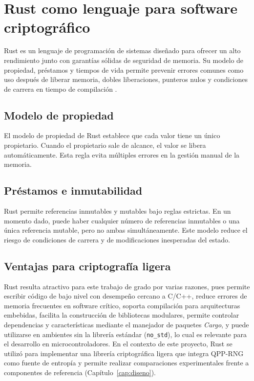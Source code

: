 \section{Rust como lenguaje para software criptográfico}

Rust es un lenguaje de programación de sistemas diseñado para ofrecer un alto rendimiento junto con garantías sólidas de seguridad de memoria. Su modelo de propiedad, préstamos y tiempos de vida permite prevenir errores comunes como uso después de liberar memoria, dobles liberaciones, punteros nulos y condiciones de carrera en tiempo de compilación \cite{Klabnik2023TheLanguage,TheRustProjectDevelopers2024TheLanguage}.

\subsection{Modelo de propiedad}

El modelo de propiedad de Rust establece que cada valor tiene un único propietario. Cuando el propietario sale de alcance, el valor se libera automáticamente. Esta regla evita múltiples errores en la gestión manual de la memoria.

\subsection{Préstamos e inmutabilidad}

Rust permite referencias inmutables y mutables bajo reglas estrictas. En un momento dado, puede haber cualquier número de referencias inmutables o una única referencia mutable, pero no ambas simultáneamente. Este modelo reduce el riesgo de condiciones de carrera y de modificaciones inesperadas del estado.

\subsection{Ventajas para criptografía ligera}

Rust resulta atractivo para este trabajo de grado por varias razones, pues permite escribir código de bajo nivel con desempeño cercano a C/C++, reduce errores de memoria frecuentes en software crítico, soporta compilación para arquitecturas embebidas, facilita la construcción de bibliotecas modulares, permite controlar dependencias y características mediante el manejador de paquetes \textit{Cargo}, y puede utilizarse en ambientes sin la librería estándar (\texttt{no\_std}), lo cual es relevante para el desarrollo en microcontroladores.
En el contexto de este proyecto, Rust se utilizó para implementar una librería criptográfica ligera que integra QPP-RNG como fuente de entropía y permite realizar comparaciones experimentales frente a componentes de referencia (Capítulo~\ref{cap:diseno}).

